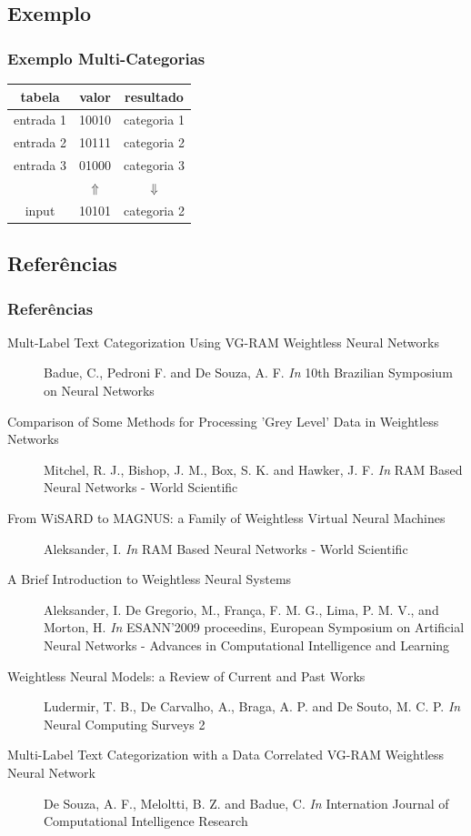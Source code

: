 \documentclass{beamer}
\begin{document}
\subsection{Exemplo}
\begin{frame}
    \frametitle{Exemplo Multi-Categorias}
    \begin{table}
        \centering
        \begin{tabular}{|c|c|c|}
            \hline
            tabela      & valor & resultado\\
            \hline
            entrada 1   & 10010 & categoria 1\\
            \hline
            entrada 2   & 10111 & categoria 2\\
            \hline
            entrada 3   & 01000 & categoria 3\\
            \hline
                        & $\Uparrow$ & $\Downarrow$\\
            \hline
            input       & 10101 & categoria 2\\
            \hline
        \end{tabular}
    \end{table}
\end{frame}
\subsection{Referências}
\begin{frame}
    \frametitle{Referências}
    \tiny
    \begin{description}
        \item[Mult-Label Text Categorization Using VG-RAM Weightless Neural Networks] Badue, C., Pedroni F. and De Souza, A. F. \emph{In} 10th Brazilian Symposium on Neural Networks
        \item[Comparison of Some Methods for Processing 'Grey Level' Data in Weightless Networks] Mitchel, R. J., Bishop, J. M., Box, S. K. and Hawker, J. F. \emph{In} RAM Based Neural Networks - World Scientific
        \item[From WiSARD to MAGNUS: a Family of Weightless Virtual Neural Machines] Aleksander, I. \emph{In} RAM Based Neural Networks - World Scientific
        \item[A Brief Introduction to Weightless Neural Systems] Aleksander, I. De Gregorio, M., França, F. M. G., Lima, P. M. V., and Morton, H. \emph{In} ESANN'2009 proceedins, European Symposium on Artificial Neural Networks - Advances in Computational Intelligence and Learning
        \item[Weightless Neural Models: a Review of Current and Past Works] Ludermir, T. B., De Carvalho, A., Braga, A. P. and De Souto, M. C. P. \emph{In} Neural Computing Surveys 2
        \item[Multi-Label Text Categorization with a Data Correlated VG-RAM Weightless Neural Network] De Souza, A. F., Meloltti, B. Z. and Badue, C. \emph{In} Internation Journal of Computational Intelligence Research
    \end{description}
\end{frame}
\end{document}
